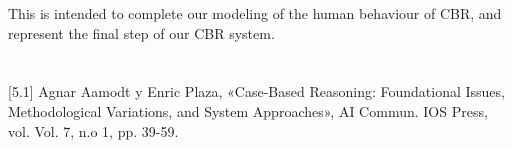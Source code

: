 This is intended to complete our modeling of the human behaviour of CBR, and represent the final step of our CBR system.

\section*{\NotasBibliograficas}
\TocNotasBibliograficas

[5.1] Agnar Aamodt y Enric Plaza, «Case-Based Reasoning: Foundational Issues, Methodological Variations, and System Approaches», AI Commun. IOS Press, vol. Vol. 7, n.o 1, pp. 39-59.

\medskip



